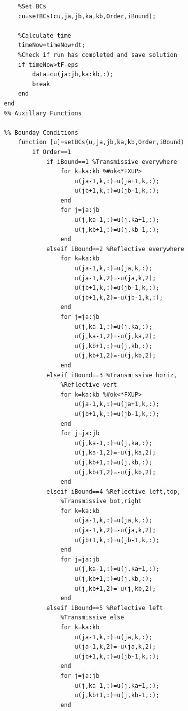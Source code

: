 \begin{lstlisting}
    %Set BCs
    cu=setBCs(cu,ja,jb,ka,kb,Order,iBound);
    
    %Calculate time
    timeNow=timeNow+dt;
    %Check if run has completed and save solution
    if timeNow>tF-eps
        data=cu(ja:jb,ka:kb,:);
        break
    end
end
%% Auxillary Functions

%% Bounday Conditions
    function [u]=setBCs(u,ja,jb,ka,kb,Order,iBound)
        if Order==1
            if iBound==1 %Transmissive everywhere
                for k=ka:kb %#ok<*FXUP>
                    u(ja-1,k,:)=u(ja+1,k,:);
                    u(jb+1,k,:)=u(jb-1,k,:);
                end
                for j=ja:jb
                    u(j,ka-1,:)=u(j,ka+1,:);
                    u(j,kb+1,:)=u(j,kb-1,:);
                end
            elseif iBound==2 %Reflective everywhere
                for k=ka:kb
                    u(ja-1,k,:)=u(ja,k,:);
                    u(ja-1,k,2)=-u(ja,k,2);
                    u(jb+1,k,:)=u(jb-1,k,:);
                    u(jb+1,k,2)=-u(jb-1,k,:);
                end
                for j=ja:jb
                    u(j,ka-1,:)=u(j,ka,:);
                    u(j,ka-1,2)=-u(j,ka,2);
                    u(j,kb+1,:)=u(j,kb,:);
                    u(j,kb+1,2)=-u(j,kb,2);
                end
            elseif iBound==3 %Transmissive horiz,
                %Reflective vert
                for k=ka:kb %#ok<*FXUP>
                    u(ja-1,k,:)=u(ja+1,k,:);
                    u(jb+1,k,:)=u(jb-1,k,:);
                end
                for j=ja:jb
                    u(j,ka-1,:)=u(j,ka,:);
                    u(j,ka-1,2)=-u(j,ka,2);
                    u(j,kb+1,:)=u(j,kb,:);
                    u(j,kb+1,2)=-u(j,kb,2);
                end
            elseif iBound==4 %Reflective left,top,
                %Transmissive bot,right
                for k=ka:kb
                    u(ja-1,k,:)=u(ja,k,:);
                    u(ja-1,k,2)=-u(ja,k,2);
                    u(jb+1,k,:)=u(jb-1,k,:);
                end
                for j=ja:jb
                    u(j,ka-1,:)=u(j,ka+1,:);
                    u(j,kb+1,:)=u(j,kb,:);
                    u(j,kb+1,2)=-u(j,kb,2);
                end
            elseif iBound==5 %Reflective left
                %Transmissive else
                for k=ka:kb
                    u(ja-1,k,:)=u(ja,k,:);
                    u(ja-1,k,2)=-u(ja,k,2);
                    u(jb+1,k,:)=u(jb-1,k,:);
                end
                for j=ja:jb
                    u(j,ka-1,:)=u(j,ka+1,:);
                    u(j,kb+1,:)=u(j,kb-1,:);
                end
                

\end{lstlisting}

